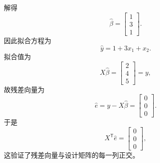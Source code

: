 \documentclass[UTF8,fontset=fandol,11pt]{ctexart}
\begin{document}
解得
\[
\hat\beta=
\begin{bmatrix}1\\3\\1\end{bmatrix}.
\]
因此拟合方程为
\[
\hat y=1+3x_1+x_2.
\]
拟合值为
\[
X\hat\beta=
\begin{bmatrix}2\\4\\5\end{bmatrix}=y,
\]
故残差向量为
\[
\hat e=y-X\hat\beta=
\begin{bmatrix}0\\0\\0\end{bmatrix}.
\]
于是
\[
X^{\mathsf T}\hat e=
\begin{bmatrix}0\\0\\0\end{bmatrix},
\]
这验证了残差向量与设计矩阵的每一列正交。\par
\end{document}
